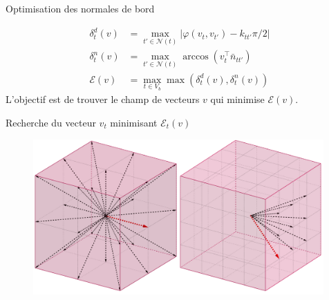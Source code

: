 \begin{frame}{Optimisation des normales de bord}

    \begin{align*}
        \delta_t^d(v) &= \max_{t' \in \mathcal{N}(t)} \left| \varphi( v_t, v_{t'} ) - k_{tt'}\pi/2 \right|\\
        \delta_t^n(v) &= \max_{t' \in \mathcal{N}(t)} \arccos\left( v_t^\top \bar{n}_{tt'}\right)\\
        \mathcal{E}(v) &= \max_{t \in V_b} \max (\delta_t^d(v), \delta_t^n(v) )
    \end{align*} 
    L'objectif est de trouver le champ de vecteurs $v$ qui minimise $\mathcal{E}(v)$.
    
\end{frame}

\begin{frame}{Recherche du vecteur $v_t$ minimisant $\mathcal{E}_t(v)$ }

    \begin{figure}
        \centering
        \includegraphics[width=0.99\textwidth]{img/hexmeshing_ff/finding_directions_in_a_cube_2.PNG}
    \end{figure}
\end{frame}

